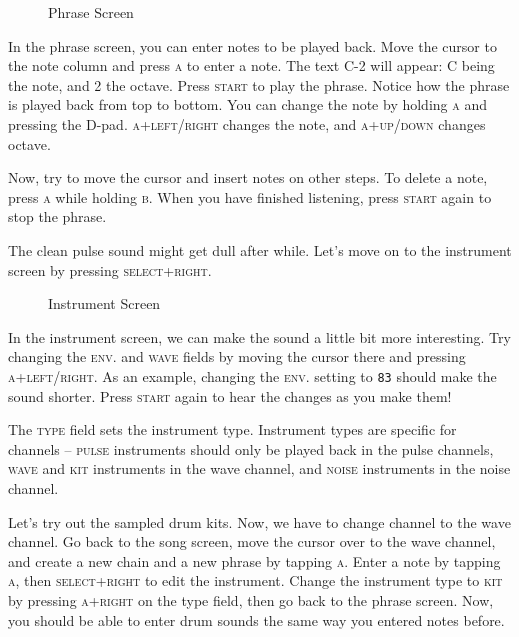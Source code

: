 \begin{figure}[hbtp]
\centering
{}
\caption{Phrase Screen}
\label{fig:phrase1}
\end{figure}

In the phrase screen, you can enter notes to be played back. Move the cursor to the note
column and press \textsc{a} to enter a note. The text C-2 will appear: C being the note, and 2 the
octave. Press \textsc{start} to play the phrase. Notice how the phrase is played back from
top to bottom. You can change the note by holding \textsc{a} and pressing the
D-pad. \textsc{a+left/right} changes the note, and \textsc{a+up/down} changes octave.

Now, try to move the cursor and insert notes on other steps.
To delete a note, press \textsc{a} while holding \textsc{b}.
When you have finished listening, press \textsc{start} again to stop the phrase.

The clean pulse sound might get dull after while. Let's move on to the instrument
screen by pressing \textsc{select+right}.

\begin{figure}[hbtp]
\centering
{}
\caption{Instrument Screen}
\label{fig:instr}
\end{figure}

In the instrument screen, we can make the sound a little bit more interesting.
Try changing the \textsc{env.} and \textsc{wave} fields by moving the cursor there and pressing \textsc{a+left/right}.
As an example, changing the \textsc{env.} setting to \texttt{83} should make the sound shorter.
Press \textsc{start} again to hear the changes as you make them!

The \textsc{type} field sets the instrument type. Instrument types are specific for
channels -- \textsc{pulse} instruments should only be played back in the pulse channels, \textsc{wave} and \textsc{kit}
instruments in the wave channel, and \textsc{noise} instruments in the noise channel.

Let's try out the sampled drum kits. Now, we have to change channel to the wave channel.
Go back to the song screen, move the cursor over to the wave channel, and create a new
chain and a new phrase by tapping \textsc{a}.
Enter a note by tapping \textsc{a}, then \textsc{select+right} to edit the instrument.
Change the instrument type to \textsc{kit} by pressing \textsc{a+right} on the type field,
then go back to the phrase screen. Now, you should be able to enter drum sounds the same way
you entered notes before.

